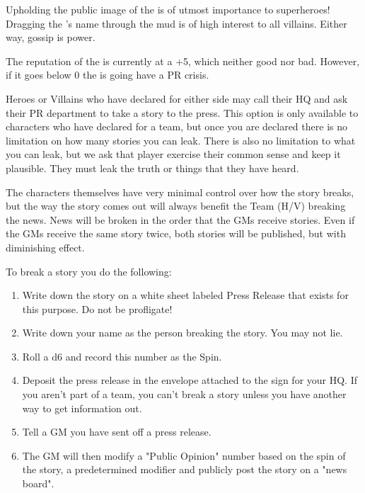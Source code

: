 \documentclass[green]{LRSguildcamp1}
\begin{document}
\name{\gPR{}}

Upholding the public image of the \cHeroLeague{\intro} is of utmost importance to superheroes! 
Dragging the \cHeroLeague{}'s name through the mud is of high interest to all villains. Either way, gossip is power. 

The reputation of the \cHeroLeague{\intro} is currently at a +5, which neither good nor bad. However, if it goes below 0 the \cHeroLeague{} is going have a PR crisis. 

Heroes or Villains who have declared for either side may call their HQ and ask their PR department to take a story to the press. This option is only available to characters who have declared for a team, but once you are declared there is no limitation on how many stories you can leak. There is also no limitation to what you can leak, but we ask that player exercise their common sense and keep it plausible. They must leak the truth or things that they have heard. 

The characters themselves have very minimal control over how the story breaks, but the way the story comes out will always benefit the Team (H/V) breaking the news. News will be broken in the order that the GMs receive stories. Even if the GMs receive the same story twice, both stories will be published, but with diminishing effect. 

To break a story you do the following:
\begin{enumerate}

\item Write down the story on a white sheet labeled Press Release that exists for this purpose. Do not be profligate! 

\item Write down your name as the person breaking the story. You may not lie. 

\item Roll a d6 and record this number as the Spin. 

\item Deposit the press release in the envelope attached to the sign for your HQ. If you aren't part of a team, you can't break a story unless you have another way to get information out. 

\item Tell a GM you have sent off a press release.

\item The GM will then modify a "Public Opinion" number based on the spin of the story, a predetermined modifier and publicly post the story on a "news board".
\end{enumerate}
\end{document}
